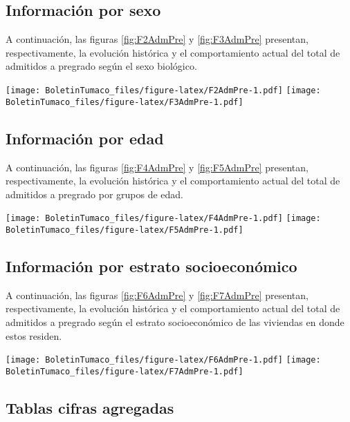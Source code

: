 \documentclass[
]{book}
\begin{document}
\hypertarget{informaciuxf3n-por-sexo-1}{%
\subsection{Información por sexo}\label{informaciuxf3n-por-sexo-1}}

A continuación, las figuras \ref{fig:F2AdmPre} y \ref{fig:F3AdmPre} presentan, respectivamente, la evolución histórica y el comportamiento actual del total de admitidos a pregrado según el sexo biológico.

\texttt{[image: BoletinTumaco\_files/figure-latex/F2AdmPre-1.pdf]}
\texttt{[image: BoletinTumaco\_files/figure-latex/F3AdmPre-1.pdf]}

\hypertarget{informaciuxf3n-por-edad-1}{%
\subsection{Información por edad}\label{informaciuxf3n-por-edad-1}}

A continuación, las figuras \ref{fig:F4AdmPre} y \ref{fig:F5AdmPre} presentan, respectivamente, la evolución histórica y el comportamiento actual del total de admitidos a pregrado por grupos de edad.

\texttt{[image: BoletinTumaco\_files/figure-latex/F4AdmPre-1.pdf]}
\texttt{[image: BoletinTumaco\_files/figure-latex/F5AdmPre-1.pdf]}

\hypertarget{informaciuxf3n-por-estrato-socioeconuxf3mico-1}{%
\subsection{Información por estrato socioeconómico}\label{informaciuxf3n-por-estrato-socioeconuxf3mico-1}}

A continuación, las figuras \ref{fig:F6AdmPre} y \ref{fig:F7AdmPre} presentan, respectivamente, la evolución histórica y el comportamiento actual del total de admitidos a pregrado según el estrato socioeconómico de las viviendas en donde estos residen.

\texttt{[image: BoletinTumaco\_files/figure-latex/F6AdmPre-1.pdf]}
\texttt{[image: BoletinTumaco\_files/figure-latex/F7AdmPre-1.pdf]}

\hypertarget{tablas-cifras-agregadas-1}{%
\subsection{Tablas cifras agregadas}\label{tablas-cifras-agregadas-1}}
\end{document}
